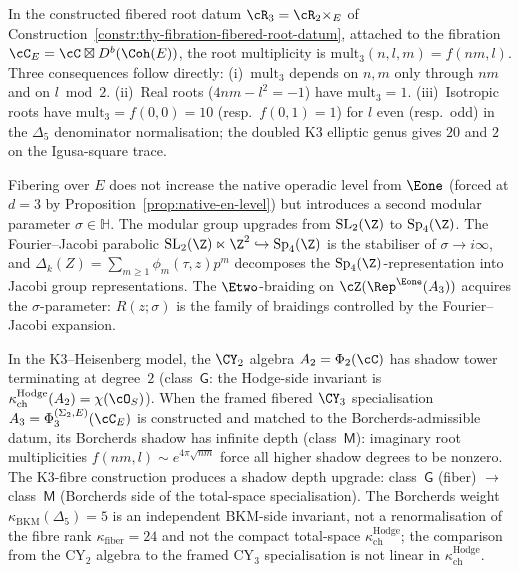 \begin{proposition}
\label{prop:thy-fibration-root-mult-transfer}
In the constructed fibered root datum $\cR_3=\cR_2\times_E$ of
Construction~\ref{constr:thy-fibration-fibered-root-datum}, attached to
the fibration $\cC_E=\cC\boxtimes D^b(\Coh(E))$, the root multiplicity is
$\mathrm{mult}_3(n,l,m)=f(nm,l)$. Three consequences follow directly:
\textup{(i)}~$\mathrm{mult}_3$ depends on $n,m$ only through $nm$ and on
$l \bmod 2$. \textup{(ii)}~Real roots ($4nm-l^2=-1$) have
$\mathrm{mult}_3 = 1$. \textup{(iii)}~Isotropic roots have
$\mathrm{mult}_3 = f(0,0)=10$ \textup{(}resp.\ $f(0,1)=1$\textup{)}
for $l$ even \textup{(}resp.\ odd\textup{)} in the $\Delta_5$ denominator
normalisation; the doubled K3 elliptic genus gives $20$ and $2$ on the
Igusa-square trace.
\end{proposition}

\begin{remark}
\label{rem:thy-fibration-e2-sp4}
Fibering over $E$ does not increase the native operadic level from $\Eone$ (forced at $d=3$ by Proposition~\ref{prop:native-en-level}) but introduces a second modular parameter $\sigma \in \mathbb{H}$. The modular group upgrades from $\mathrm{SL}_2(\Z)$ to $\mathrm{Sp}_4(\Z)$. The Fourier--Jacobi parabolic $\mathrm{SL}_2(\Z)\ltimes\Z^2 \hookrightarrow \mathrm{Sp}_4(\Z)$ is the stabiliser of $\sigma \to i\infty$, and $\Delta_k(Z) = \sum_{m \geq 1}\phi_m(\tau,z)p^m$ decomposes the $\mathrm{Sp}_4(\Z)$-representation into Jacobi group representations. The $\Etwo$-braiding on $\cZ(\Rep^{\Eone}(A_3))$ acquires the $\sigma$-parameter: $R(z;\sigma)$ is the family of braidings controlled by the Fourier--Jacobi expansion.
\end{remark}

\begin{remark}
\label{rem:thy-fibration-shadow-depth-upgrade}
In the K3--Heisenberg model, the $\CY_2$ algebra
$A_2=\Phi_2(\cC)$ has shadow tower terminating at degree~$2$
\textup{(}class~$\mathsf{G}$: the Hodge-side invariant is
$\kappa_{\mathrm{ch}}^{\mathrm{Hodge}}(A_2)=\chi(\cO_S)$\textup{)}.
When the framed fibered $\CY_3$ specialisation
$A_3=\Phi_3^{(\Sigma_2,E)}(\cC_E)$ is constructed and matched to the
Borcherds-admissible datum, its Borcherds shadow has infinite depth
\textup{(}class~$\mathsf{M}$\textup{)}: imaginary root multiplicities
$f(nm,l) \sim e^{4\pi\sqrt{nm}}$ force all higher shadow degrees to be
nonzero.  The K3-fibre construction produces a shadow depth upgrade:
class~$\mathsf{G}$ \textup{(}fiber\textup{)} $\to$ class~$\mathsf{M}$
\textup{(}Borcherds side of the total-space specialisation\textup{)}.
The Borcherds weight $\kappa_{\mathrm{BKM}}(\Delta_5)=5$ is an
independent BKM-side invariant, not a renormalisation of the fibre rank
$\kappa_{\mathrm{fiber}}=24$ and not the compact total-space
$\kappa_{\mathrm{ch}}^{\mathrm{Hodge}}$; the comparison from the
CY$_2$ algebra to the framed CY$_3$ specialisation is not linear in
$\kappa_{\mathrm{ch}}^{\mathrm{Hodge}}$.
\end{remark}

